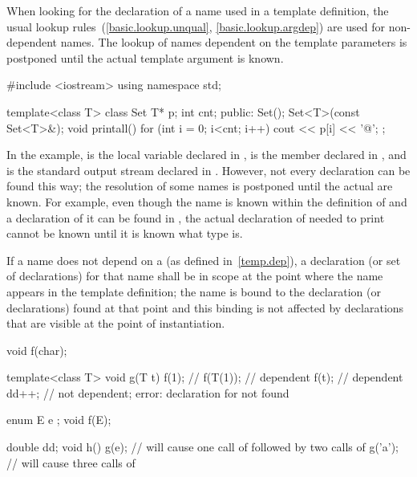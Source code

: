 \pnum
When looking for the declaration of a name used in a template definition,
the usual lookup rules~(\ref{basic.lookup.unqual}, \ref{basic.lookup.argdep})
are used for non-dependent names.
The lookup of names dependent on the template parameters
is postponed until the actual template argument is known.
\begin{example}
\begin{codeblock}
#include <iostream>
using namespace std;

template<class T> class Set {
  T* p;
  int cnt;
public:
  Set();
  Set<T>(const Set<T>&);
  void printall() {
    for (int i = 0; i<cnt; i++)
      cout << p[i] << '@\textbackslash@n';
  }
};
\end{codeblock}

In the example,
is the local variable
declared in
,
is the member
declared in
,
and
is the standard output stream declared in
.
However, not every declaration can be found this way; the resolution of
some names is postponed
until the actual
are known.
For example, even though the name
is known within the definition of
and a declaration of it can be found in
,
the actual declaration of
needed to print
cannot be known until it is known what type
is.
\end{example}

\pnum
If a name does not depend on a
(as defined in~\ref{temp.dep}), a declaration (or set of declarations) for that
name shall be in scope at the point where the name appears in the template
definition; the name is bound to the declaration (or declarations) found
at that point and this binding is not affected by declarations that are
visible at the point of instantiation.
\begin{example}
\begin{codeblock}
void f(char);

template<class T> void g(T t) {
  f(1);             // 
  f(T(1));          // dependent
  f(t);             // dependent
  dd++;             // not dependent; error: declaration for  not found
}

enum E { e };
void f(E);

double dd;
void h() {
  g(e);             // will cause one call of  followed by two calls of 
  g('a');           // will cause three calls of 
}
\end{codeblock}
\end{example}

